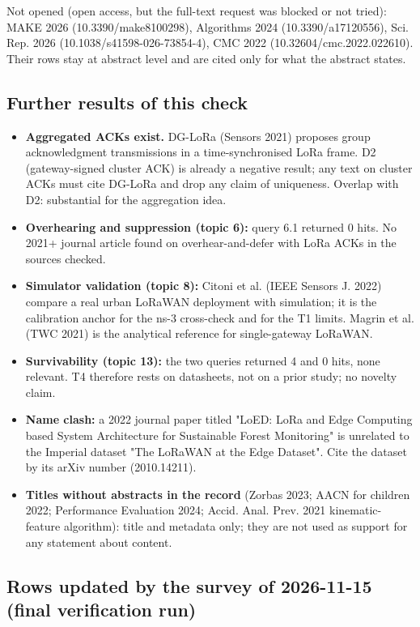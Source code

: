 Not opened (open access, but the full-text request was blocked or not tried): MAKE 2026 (10.3390/make8100298), Algorithms 2024 (10.3390/a17120556), Sci. Rep. 2026 (10.1038/s41598-026-73854-4), CMC 2022 (10.32604/cmc.2022.022610). Their rows stay at abstract level and are cited only for what the abstract states.

\subsection*{Further results of this check}

\begin{itemize}
\item \textbf{Aggregated ACKs exist.} DG-LoRa (Sensors 2021) proposes group acknowledgment transmissions in a time-synchronised LoRa frame. D2 (gateway-signed cluster ACK) is already a negative result; any text on cluster ACKs must cite DG-LoRa and drop any claim of uniqueness. Overlap with D2: substantial for the aggregation idea.
\item \textbf{Overhearing and suppression (topic 6):} query 6.1 returned 0 hits. No 2021+ journal article found on overhear-and-defer with LoRa ACKs in the sources checked.
\item \textbf{Simulator validation (topic 8):} Citoni et al. (IEEE Sensors J. 2022) compare a real urban LoRaWAN deployment with simulation; it is the calibration anchor for the ns-3 cross-check and for the T1 limits. Magrin et al. (TWC 2021) is the analytical reference for single-gateway LoRaWAN.
\item \textbf{Survivability (topic 13):} the two queries returned 4 and 0 hits, none relevant. T4 therefore rests on datasheets, not on a prior study; no novelty claim.
\item \textbf{Name clash:} a 2022 journal paper titled "LoED: LoRa and Edge Computing based System Architecture for Sustainable Forest Monitoring" is unrelated to the Imperial dataset "The LoRaWAN at the Edge Dataset". Cite the dataset by its arXiv number (2010.14211).
\item \textbf{Titles without abstracts in the record} (Zorbas 2023; AACN for children 2022; Performance Evaluation 2024; Accid. Anal. Prev. 2021 kinematic-feature algorithm): title and metadata only; they are not used as support for any statement about content.
\end{itemize}


\subsection*{Rows updated by the survey of 2026-11-15 (final verification run)}

